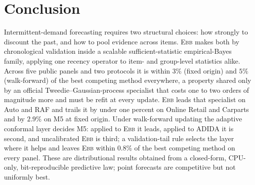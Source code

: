 \documentclass[twoside]{article}
\theoremstyle{definition}
\newcommand{\EBB}{\textsc{Ebb}}
\begin{document}
\section{Conclusion}\label{sec:conclusion}

Intermittent-demand forecasting requires two structural choices: how
strongly to discount the past, and how to pool evidence across items.
\EBB{} makes both by chronological validation inside a scalable
sufficient-statistic empirical-Bayes family, applying one recency operator
to item- and group-level statistics alike. %
Across five public panels and two
protocols it is within $3\%$ (fixed origin) and $5\%$ (walk-forward) of
the best competing method everywhere, a property shared only by an
official Tweedie--Gaussian-process specialist that costs one to two orders
of magnitude more and must be refit at every update. \EBB{} leads that
specialist on Auto and RAF and trails it by under one percent on Online
Retail and Carparts and by $2.9\%$ on M5 at fixed origin. Under
walk-forward updating the adaptive conformal layer decides M5: applied to
\EBB{} it leads, applied to ADIDA it is second, and uncalibrated \EBB{} is
third; a validation-tail rule selects the layer where it helps and leaves
\EBB{} within 0.8\% of the best competing method on every panel. These are distributional results obtained from a
closed-form, CPU-only, bit-reproducible predictive law; point forecasts
are competitive but not uniformly best.
\end{document}
